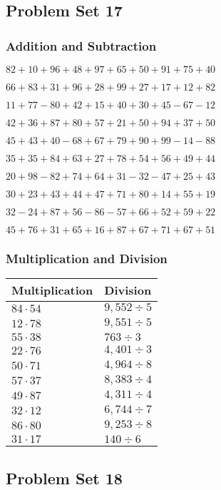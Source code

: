 \hypertarget{problem-set-17-1}{%
\subsection{Problem Set 17}\label{problem-set-17-1}}

\hypertarget{addition-and-subtraction-57}{%
\subsubsection{Addition and
Subtraction}\label{addition-and-subtraction-57}}

\(82+10+96+48+97+65+50+91+75+ 40\)

\(66+83+31+96+28+99+27+17+12+82\)

\(11+77-80+42+15+40+30+45-67-12\)

\(42+36+87+80+57+21+50+94+37+50\)

\(45+43+40-68+67+79+90+99-14-88\)

\(35+35+84+63+27+78+54+56+49+44\)

\(20+98-82+74+64+31-32-47+25+43\)

\(30+23+43+44+47+71+80+14+55+19\)

\(32-24+87+56-86-57+66+52+59+22\)

\(45+76+31+65+16+87+67+71+67+51\)

\hypertarget{multiplication-and-division-57}{%
\subsubsection{Multiplication and
Division}\label{multiplication-and-division-57}}

\begin{longtable}[]{@{}ll@{}}
\toprule
Multiplication & Division\tabularnewline
\midrule
\endhead
\(84\cdot54\) & \(9,552÷5\)\tabularnewline
\(12\cdot78\) & \(9,551÷5\)\tabularnewline
\(55\cdot38\) & \(763÷3\)\tabularnewline
\(22\cdot76\) & \(4,401÷3\)\tabularnewline
\(50\cdot71\) & \(4,964÷8\)\tabularnewline
\(57\cdot37\) & \(8,383÷4\)\tabularnewline
\(49\cdot87\) & \(4,311÷4\)\tabularnewline
\(32\cdot12\) & \(6,744÷7\)\tabularnewline
\(86\cdot80\) & \(9,253÷8\)\tabularnewline
\(31\cdot17\) & \(140÷6\)\tabularnewline
\bottomrule
\end{longtable}

\hypertarget{problem-set-18-1}{%
\subsection{Problem Set 18}\label{problem-set-18-1}}

